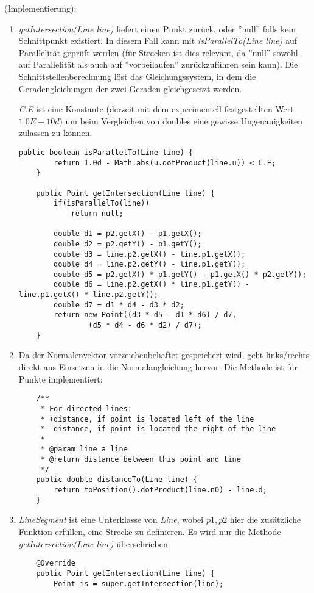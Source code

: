 \documentclass[a4paper, titlepage=false, parskip=full-, 10pt]{scrartcl}
\newcounter{tasknbr}
\newenvironment{task}[1]{{\bf Aufgabe \arabic {tasknbr}\stepcounter{tasknbr}} (#1):\begin{enumerate}}{\end{enumerate}}
\newcommand{\subtask}[1]{\item[#1)]}
\begin{document}
\begin{task}{Implementierung}
\subtask{b}
\emph{getIntersection(Line line)} liefert einen Punkt zurück, oder ''null'' falls kein Schnittpunkt existiert. In diesem Fall kann mit \emph{isParallelTo(Line line)} auf Parallelität geprüft werden (für Strecken ist dies relevant, da ''null'' sowohl auf Parallelität als auch auf ''vorbeilaufen'' zurückzuführen sein kann). Die Schnittstellenberechnung löst das Gleichungssystem, in dem die Geradengleichungen der zwei Geraden gleichgesetzt werden.

\emph{C.E} ist eine Konstante (derzeit mit dem experimentell festgestellten Wert $1.0E-10d$) um beim Vergleichen von doubles eine gewisse Ungenauigkeiten zulassen zu können.
\begin{lstlisting}
public boolean isParallelTo(Line line) {
        return 1.0d - Math.abs(u.dotProduct(line.u)) < C.E;
    }

    public Point getIntersection(Line line) {
        if(isParallelTo(line))
            return null;

        double d1 = p2.getX() - p1.getX();
        double d2 = p2.getY() - p1.getY();
        double d3 = line.p2.getX() - line.p1.getX();
        double d4 = line.p2.getY() - line.p1.getY();
        double d5 = p2.getX() * p1.getY() - p1.getX() * p2.getY();
        double d6 = line.p2.getX() * line.p1.getY() - line.p1.getX() * line.p2.getY();
        double d7 = d1 * d4 - d3 * d2;
        return new Point((d3 * d5 - d1 * d6) / d7,
                (d5 * d4 - d6 * d2) / d7);
    }
\end{lstlisting}

\subtask{c}
Da der Normalenvektor vorzeichenbehaftet gespeichert wird, geht links/rechts direkt aus Einsetzen in die Normalangleichung hervor. Die Methode ist für Punkte implementiert:
\begin{lstlisting}
    /**
     * For directed lines:
     * +distance, if point is located left of the line
     * -distance, if point is located the right of the line
     * 
     * @param line a line
     * @return distance between this point and line
     */
    public double distanceTo(Line line) {
        return toPosition().dotProduct(line.n0) - line.d;
    }
\end{lstlisting}

\subtask{d}
\emph{LineSegment} ist eine Unterklasse von \emph{Line}, wobei $p1, p2$ hier die zusätzliche Funktion erfüllen, eine Strecke zu definieren. Es wird nur die Methode \emph{getIntersection(Line line)} überschrieben:
\begin{lstlisting}
    @Override
    public Point getIntersection(Line line) {
        Point is = super.getIntersection(line);


\end{lstlisting}
\end{task}
\end{document}
